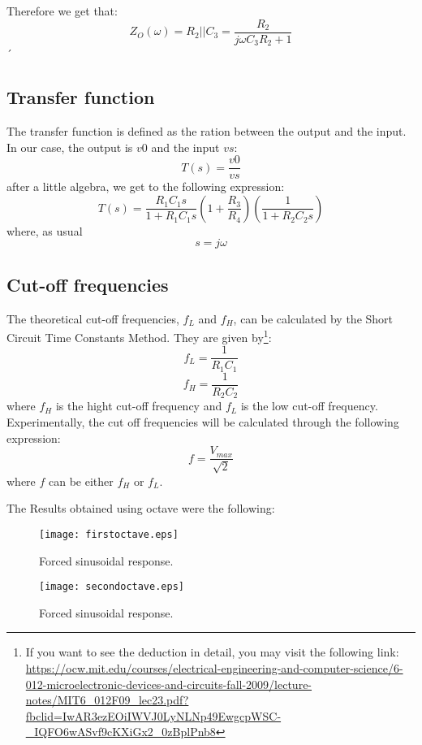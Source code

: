 Therefore we get that:
\begin{equation}
 Z_O(\omega) = R_2 || C_3 = \frac{R_2}{j\omega C_3 R_2 + 1}  
\end{equation}
´
\subsection{Transfer function}
The transfer function is defined as the ration between the output and the input. In our case, the output is $v0$ and the input $vs$:
\begin{equation*}
    T(s)=\frac{v0}{vs}
\end{equation*}
after a little algebra, we get to the following expression:
\begin{equation}
    T(s)=\frac{R_{1}C_{1}s}{1+R_{1}C_{1}s} (1 + \frac{R_{3}}{R_4}) (\frac{1}{1+ R_{2} C_{2}s}) 
\end{equation}
where, as usual
\begin{equation*}
    s = j\omega
\end{equation*}

\subsection{Cut-off frequencies}
The theoretical cut-off frequencies, $f_L$ and $f_H$, can be calculated by the Short Circuit Time Constants Method. They are given by\footnote{If you want to see the deduction in detail, you may visit the following link: \url{https://ocw.mit.edu/courses/electrical-engineering-and-computer-science/6-012-microelectronic-devices-and-circuits-fall-2009/lecture-notes/MIT6_012F09_lec23.pdf?fbclid=IwAR3ezEOiIWVJ0LyNLNp49EwgcpWSC-_IQFO6wASvf9cKXiGx2_0zBplPnb8}}:
\begin{equation}
    f_L = \frac{1}{R_1C_1}
\end{equation}
\begin{equation}
    f_H = \frac{1}{R_2C_2}
\end{equation}
where $f_H$ is the hight cut-off frequency and $f_L$ is the low cut-off frequency.
Experimentally, the cut off frequencies will be calculated through the following expression:
\begin{equation*}
    f = \frac{V_{max}}{\sqrt{2}}
\end{equation*}
where $f$ can be either $f_H$ or $f_L$.


The Results obtained using octave were the following:




\begin{figure}[H] \centering
\texttt{[image: firstoctave.eps]}
\caption{Forced sinusoidal response.}
\label{fig:forced}
\end{figure}

\begin{figure}[H] \centering
    \texttt{[image: secondoctave.eps]}
    \caption{Forced sinusoidal response.}
    \label{fig:forced}
    \end{figure}